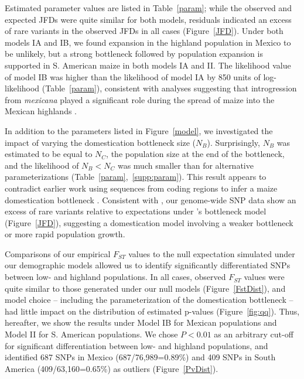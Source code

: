 Estimated parameter values are listed in Table~\ref{param}; while the observed and expected JFDs were quite similar for both models,  residuals indicated an excess of rare variants in the observed JFDs in all cases (Figure~\ref{JFD}). 
Under both models IA and IB,  we found expansion in the highland population in Mexico to be unlikely, but a strong bottleneck followed by population expansion is supported in S. American maize in both models IA and II.  
The likelihood value of model IB was higher than the likelihood of model IA by 850 units of log-likelihood (Table~\ref{param}), consistent with analyses suggesting that introgression from \textit{mexicana} played a significant role during the spread of maize into the Mexican highlands \cite[]{Profford_2013}. 

In addition to the parameters listed in Figure~\ref{model}, we investigated the impact of varying the domestication bottleneck size ($N_B$).  
Surprisingly, $N_B$ was estimated to be equal to $N_C$, the population size at the end of the bottleneck, and the likelihood of $N_B<N_C$ was much smaller than for alternative parameterizations (Table~\ref{param},~\ref{supp:param}). This result appears to contradict earlier work using sequences from coding regions to infer a maize domestication bottleneck \cite[]{Eyre-Walker_1998_9539756,Tenaillon_2004_15014173,Wright_2005_15919994}.  
Consistent with \citet{Hufford_2012_22660546}, our genome-wide SNP data show an excess of rare variants relative to expectations under \cite{Wright_2005_15919994}'s bottleneck model (Figure~\ref{JFD}), suggesting a domestication model involving a weaker bottleneck or more rapid population growth.

Comparisons of our empirical $F_{ST}$ values to the null expectation simulated under our demographic models allowed us to identify significantly differentiated SNPs between low- and highland populations. In all cases, observed $F_{ST}$ values were quite similar to those generated under our null models (Figure~\ref{FstDist}), and model choice -- including the parameterization of the domestication bottleneck -- had little impact on the distribution of estimated p-values (Figure~\ref{fig:qq}). 
Thus, hereafter, we show the results under Model IB for Mexican populations and Model II for S. American populations.
We chose $P<0.01$ as an arbitrary cut-off for significant differentiation between low- and highland populations, and identified 687 SNPs in Mexico (687/76,989=0.89\%) and 409 SNPs in South America (409/63,160=0.65\%) as outliers (Figure~\ref{PvDist}).



